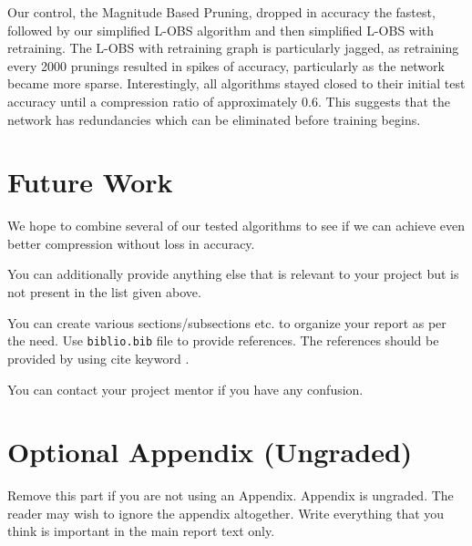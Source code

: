 \documentclass{article}
\begin{document}
Our control, the Magnitude Based Pruning, dropped in accuracy the fastest, followed by our simplified L-OBS algorithm and then simplified L-OBS with retraining. The L-OBS with retraining graph is particularly jagged, as retraining every 2000 prunings resulted in spikes of accuracy, particularly as the network became more sparse. Interestingly, all algorithms stayed closed to their initial test accuracy until a compression ratio of approximately 0.6. This suggests that the network has redundancies which can be eliminated before training begins.

\section{Future Work}
\label{Future Work}

We hope to combine several of our tested algorithms to see if we can achieve even better compression without loss in accuracy.

You can additionally provide anything else that is relevant to your project but is not present in the list given above. 

You can create various sections/subsections etc. to organize your report as per the need. Use \texttt{biblio.bib} file to provide references. The references should be provided by using cite keyword \cite{langley00}.

You can contact your project mentor if you have any confusion.


\newpage






\appendix
\section{Optional Appendix (Ungraded)}
Remove this part if you are not using an Appendix. Appendix is ungraded. The
reader may wish to ignore the appendix altogether. Write everything that you
think is important in the main report text only.

\end{document}
